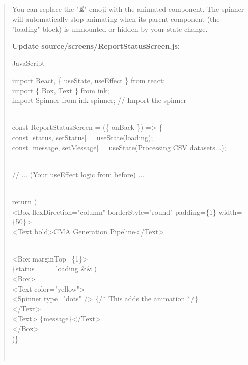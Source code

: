 \begin{quote}
You can replace the "⏳" emoji with the animated component. The spinner
will automatically stop animating when its parent component (the
"loading" block) is unmounted or hidden by your state change.

\textbf{Update source/screens/ReportStatusScreen.js:}

JavaScript

import React, \{ useState, useEffect \} from
\textquotesingle react\textquotesingle;\\
import \{ Box, Text \} from \textquotesingle ink\textquotesingle;\\
import Spinner from \textquotesingle ink-spinner\textquotesingle; //
Import the spinner\\
\strut \\
const ReportStatusScreen = (\{ onBack \}) =\textgreater{} \{\\
const {[}status, setStatus{]} =
useState(\textquotesingle loading\textquotesingle);\\
const {[}message, setMessage{]} = useState(\textquotesingle Processing
CSV datasets...\textquotesingle);\\
\strut \\
// ... (Your useEffect logic from before) ...\\
\strut \\
return (\\
\textless Box flexDirection="column" borderStyle="round" padding=\{1\}
width=\{50\}\textgreater{}\\
\textless Text bold\textgreater CMA Generation
Pipeline\textless/Text\textgreater{}\\
\strut \\
\textless Box marginTop=\{1\}\textgreater{}\\
\{status === \textquotesingle loading\textquotesingle{} \&\& (\\
\textless Box\textgreater{}\\
\textless Text color="yellow"\textgreater{}\\
\textless Spinner type="dots" /\textgreater{} \{/* This adds the
animation */\}\\
\textless/Text\textgreater{}\\
\textless Text\textgreater{} \{message\}\textless/Text\textgreater{}\\
\textless/Box\textgreater{}\\
)\}\\
\strut \\

\end{quote}
